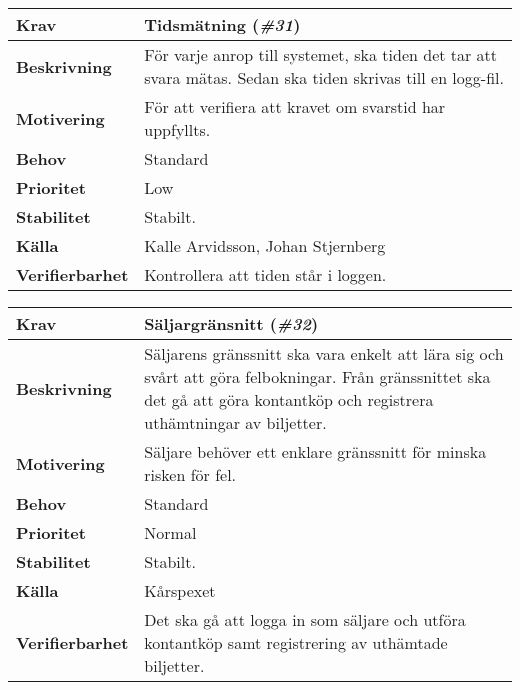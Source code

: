 \documentclass[a4paper, twoside, 11pt, titlepage]{article}
\begin{document}
	\begin{tabular} { p{2.6cm} p{12.5cm} }
		\hline
		\sffamily\textbf{Krav} & Tidsmätning (\emph{\#31})  \\
		\hline
		\sffamily\textbf{Beskrivning} & För varje anrop till systemet, ska tiden det tar att svara mätas. Sedan ska tiden skrivas till en logg-fil.  \\
		\hline
		\sffamily\textbf{Motivering} & För att verifiera att kravet om svarstid har uppfyllts.  \\
		\hline
		\sffamily\textbf{Behov} & Standard  \\
		\hline
		\sffamily\textbf{Prioritet} & Low  \\
		\hline
		\sffamily\textbf{Stabilitet} & Stabilt.  \\
		\hline
		\sffamily\textbf{Källa} & Kalle Arvidsson, Johan Stjernberg  \\
		\hline
		\sffamily\textbf{Verifierbarhet} & Kontrollera att tiden står i loggen.  \\
		\hline
	\end{tabular}
	\vspace{6mm}

	\begin{tabular} { p{2.6cm} p{12.5cm} }
		\hline
		\sffamily\textbf{Krav} & Säljargränsnitt (\emph{\#32})  \\
		\hline
		\sffamily\textbf{Beskrivning} & Säljarens gränssnitt ska vara enkelt att lära sig och svårt att göra felbokningar. Från gränssnittet ska det gå att göra kontantköp och registrera uthämtningar av biljetter.  \\
		\hline
		\sffamily\textbf{Motivering} & Säljare behöver ett enklare gränssnitt för minska risken för fel.  \\
		\hline
		\sffamily\textbf{Behov} & Standard  \\
		\hline
		\sffamily\textbf{Prioritet} & Normal  \\
		\hline
		\sffamily\textbf{Stabilitet} & Stabilt.  \\
		\hline
		\sffamily\textbf{Källa} & Kårspexet  \\
		\hline
		\sffamily\textbf{Verifierbarhet} & Det ska gå att logga in som säljare och utföra kontantköp samt registrering av uthämtade biljetter.  \\
		\hline
	\end{tabular}
	\vspace{6mm}
\end{document}
